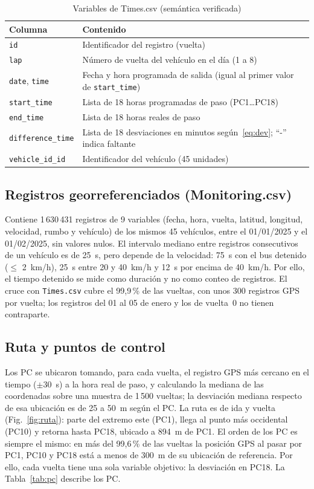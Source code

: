 \documentclass[conference]{IEEEtran}
\newcommand{\tablesize}{\fontsize{7}{8.4}\selectfont}
\begin{document}
\begin{table}[!t]
\centering
\caption{Variables de Times.csv (semántica verificada)}\label{tab:vars}
\tablesize
\begin{tabular}{@{}lp{5.6cm}@{}}
\toprule
Columna & Contenido \\
\midrule
\texttt{id} & Identificador del registro (vuelta) \\
\texttt{lap} & Número de vuelta del vehículo en el día (1 a 8) \\
\texttt{date}, \texttt{time} & Fecha y hora programada de salida (igual al primer valor de \texttt{start\_time}) \\
\texttt{start\_time} & Lista de 18 horas programadas de paso (PC1\ldots PC18) \\
\texttt{end\_time} & Lista de 18 horas reales de paso \\
\texttt{difference\_time} & Lista de 18 desviaciones en minutos según~\eqref{eq:dev}; ``-'' indica faltante \\
\texttt{vehicle\_id\_id} & Identificador del vehículo (45 unidades) \\
\bottomrule
\end{tabular}
\end{table}

\subsection{Registros georreferenciados (Monitoring.csv)}
Contiene 1\,630\,431 registros de 9 variables (fecha, hora, vuelta, latitud, longitud, velocidad, rumbo y vehículo) de los mismos 45 vehículos, entre el 01/01/2025 y el 01/02/2025, sin valores nulos. El intervalo mediano entre registros consecutivos de un vehículo es de 25~s, pero depende de la velocidad: 75~s con el bus detenido ($\leq$ 2~km/h), 25~s entre 20 y 40~km/h y 12~s por encima de 40~km/h. Por ello, el tiempo detenido se mide como duración y no como conteo de registros. El cruce con \texttt{Times.csv} cubre el 99,9\,\% de las vueltas, con unos 300 registros GPS por vuelta; los registros del 01 al 05 de enero y los de vuelta~0 no tienen contraparte.

\subsection{Ruta y puntos de control}
Los PC se ubicaron tomando, para cada vuelta, el registro GPS más cercano en el tiempo ($\pm$30~s) a la hora real de paso, y calculando la mediana de las coordenadas sobre una muestra de 1\,500 vueltas; la desviación mediana respecto de esa ubicación es de 25 a 50~m según el PC. La ruta es de ida y vuelta (Fig.~\ref{fig:ruta}): parte del extremo este (PC1), llega al punto más occidental (PC10) y retorna hasta PC18, ubicado a 894~m de PC1. El orden de los PC es siempre el mismo: en más del 99,6\,\% de las vueltas la posición GPS al pasar por PC1, PC10 y PC18 está a menos de 300~m de su ubicación de referencia. Por ello, cada vuelta tiene una sola variable objetivo: la desviación en PC18. La Tabla~\ref{tab:pc} describe los PC.
\end{document}
